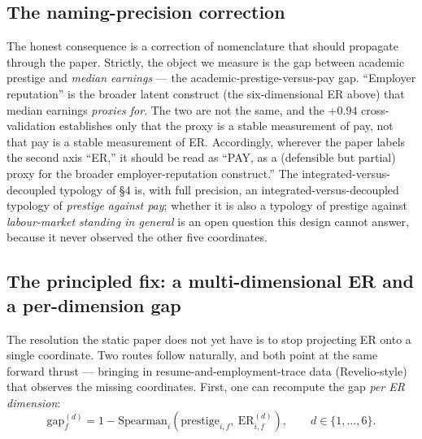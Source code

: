 \documentclass[11pt]{article}
\begin{document}
\subsection{The naming-precision correction}

The honest consequence is a correction of nomenclature that should propagate through the paper. Strictly, the object we measure is the gap between academic prestige and \emph{median earnings} --- the academic-prestige-versus-pay gap. ``Employer reputation'' is the broader latent construct (the six-dimensional ER above) that median earnings \emph{proxies for}. The two are not the same, and the $+0.94$ cross-validation establishes only that the proxy is a stable measurement of pay, not that pay is a stable measurement of ER. Accordingly, wherever the paper labels the second axis ``ER,'' it should be read as ``PAY, as a (defensible but partial) proxy for the broader employer-reputation construct.'' The integrated-versus-decoupled typology of \S4 is, with full precision, an integrated-versus-decoupled typology of \emph{prestige against pay}; whether it is also a typology of prestige against \emph{labour-market standing in general} is an open question this design cannot answer, because it never observed the other five coordinates.

\subsection{The principled fix: a multi-dimensional ER and a per-dimension gap}

The resolution the static paper does not yet have is to stop projecting ER onto a single coordinate. Two routes follow naturally, and both point at the same forward thrust --- bringing in resume-and-employment-trace data (Revelio-style) that observes the missing coordinates. First, one can recompute the gap \emph{per ER dimension}:
\[
\mathrm{gap}^{(d)}_f = 1 - \mathrm{Spearman}_i\!\left(\mathrm{prestige}_{i,f},\ \mathrm{ER}^{(d)}_{i,f}\right), \qquad d \in \{1,\dots,6\}.
\]
\end{document}
